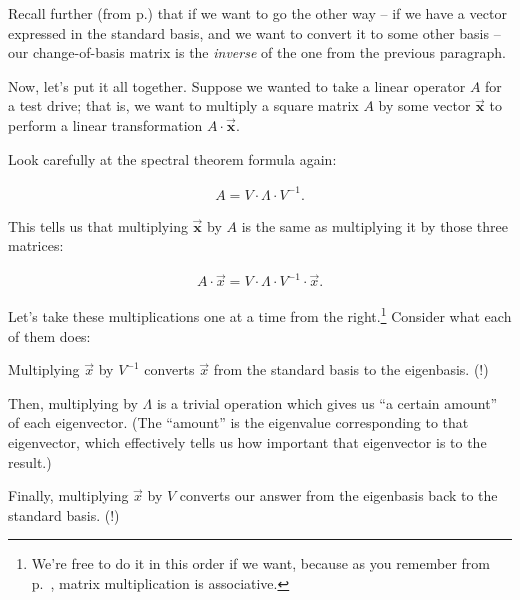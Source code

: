 Recall further (from p.\pageref{changeOfBasisOtherWayFinally}) that if we want
to go the other way -- if we have a vector expressed in the standard basis, and
we want to convert it to some other basis -- our change-of-basis matrix is the
\textit{inverse} of the one from the previous paragraph.

Now, let's put it all together. Suppose we wanted to take a linear operator $A$
for a test drive; that is, we want to multiply a square matrix $A$ by some
vector $\overrightarrow{\textbf{x}}$ to perform a linear transformation $A
\cdot \overrightarrow{\textbf{x}}$.

Look carefully at the spectral theorem formula again:

\vspace{-.15in}
\begin{align*}
A = V \cdot \Lambda \cdot V^{-1}.
\end{align*}
\vspace{-.15in}

This tells us that multiplying $\overrightarrow{\textbf{x}}$ by $A$ is the same
as multiplying it by those three matrices:

\vspace{-.15in}
\begin{align*}
A \cdot \overrightarrow{x} = V \cdot \Lambda \cdot V^{-1} \cdot
\overrightarrow{x}.
\end{align*}
\vspace{-.15in}


Let's take these multiplications one at a time from the right.\footnote{We're
free to do it in this order if we want, because as you remember from
p.~\pageref{associative}, matrix multiplication is associative.} Consider what
each of them does:

\begin{compactenum}

\item Multiplying $\overrightarrow{x}$ by $V^{-1}$ converts
$\overrightarrow{x}$ from the standard basis to the eigenbasis. (!)

\item Then, multiplying by $\Lambda$ is a trivial operation which gives us ``a
certain amount'' of each eigenvector. (The ``amount'' is the eigenvalue
corresponding to that eigenvector, which effectively tells us how important
that eigenvector is to the result.)

\item Finally, multiplying $\overrightarrow{x}$ by $V$ converts
our answer from the eigenbasis back to the standard basis. (!)

\end{compactenum}

